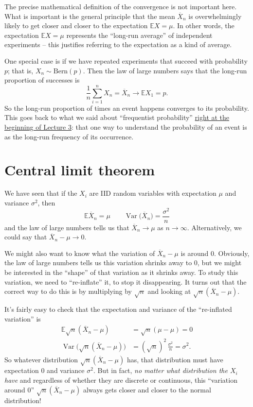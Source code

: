 \documentclass[
  a4paper,
]{book}
\theoremstyle{definition}
\theoremstyle{definition}
\theoremstyle{definition}
\theoremstyle{definition}
\theoremstyle{remark}
\begin{document}
The precise mathematical definition of the convergence is not important here. What is important is the general principle that the mean \(\overline X_n\) is overwhelmingly likely to get closer and closer to the expectation \(\mathbb EX = \mu\). In other words, the expectation \(\mathbb EX = \mu\) represents the ``long-run average'' of independent experiments -- this justifies referring to the expectation as a kind of average.

One special case is if we have repeated experiments that succeed with probability \(p\); that is, \(X_n \sim \text{Bern}(p)\). Then the law of large numbers says that the long-run proportion of successes is
\[ \frac{1}{n} \sum_{i = 1}^n X_n = \overline X_n \to \mathbb EX_1 = p . \]
So the long-run proportion of times an event happens converges to its probability. This goes back to what we said about ``frequentist probability'' \protect\hyperlink{what-is-prob}{right at the beginning of Lecture 3}: that one way to understand the probability of an event is as the long-run frequency of its occurrence.

\hypertarget{clt}{%
\section{Central limit theorem}\label{clt}}

We have seen that if the \(X_i\) are IID random variables with expectation \(\mu\) and variance \(\sigma^2\), then
\[ \mathbb E\overline X_n = \mu \qquad \operatorname{Var}\big(\overline X_n\big) = \frac{\sigma^2}{n} \]
and the law of large numbers tells us that \(\overline X_n \to \mu\) as \(n \to \infty\). Alternatively, we could say that \(\overline X_n - \mu \to 0\).

We might also want to know what the variation of \(\overline X_n - \mu\) is around 0. Obviously, the law of large numbers tells us this variation shrinks away to 0, but we might be interested in the ``shape'' of that variation as it shrinks away. To study this variation, we need to ``re-inflate'' it, to stop it disappearing. It turns out that the correct way to do this is by multiplying by \(\sqrt{n}\) and looking at \(\sqrt{n}(\overline X_n - \mu)\).

It's fairly easy to check that the expectation and variance of the ``re-inflated variation'' is
\begin{align*}
\mathbb E\sqrt{n} (\overline X_n - \mu) &= \sqrt{n}(\mu - \mu) = 0 \\
\operatorname{Var}\big(\sqrt{n} (\overline X_n - \mu)\big) &= (\sqrt n)^2 \, \frac{\sigma^2}{n} = \sigma^2 . 
\end{align*}
So whatever distribution \(\sqrt{n}(\overline X_n - \mu)\) has, that distribution must have expectation \(0\) and variance \(\sigma^2\). But in fact, \emph{no matter what distribution the \(X_i\) have} and regardless of whether they are discrete or continuous, this ``variation around 0'' \(\sqrt{n}(\overline X_n - \mu)\) always gets closer and closer to the normal distribution!
\end{document}
